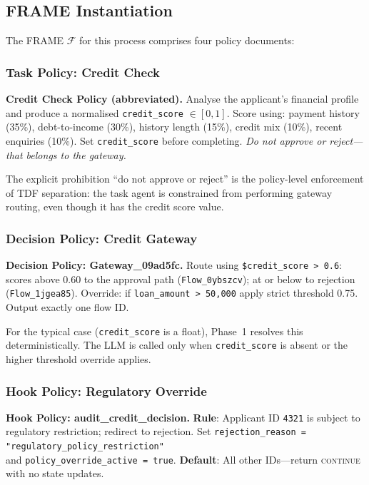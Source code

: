 \documentclass[11pt,a4paper]{article}
\begin{document}
\subsection{FRAME Instantiation}

The FRAME $\mathcal{F}$ for this process comprises four policy documents:

\subsubsection{Task Policy: Credit Check}

\begin{policybox}
\textbf{Credit Check Policy (abbreviated).}
Analyse the applicant's financial profile and produce a normalised
\texttt{credit\_score} $\in [0,1]$. Score using: payment history (35\%),
debt-to-income (30\%), history length (15\%), credit mix (10\%), recent
enquiries (10\%). Set \texttt{credit\_score} before completing. \emph{Do not
approve or reject---that belongs to the gateway.}
\end{policybox}

The explicit prohibition ``do not approve or reject'' is the policy-level
enforcement of TDF separation: the task agent is constrained from performing
gateway routing, even though it has the credit score value.

\subsubsection{Decision Policy: Credit Gateway}

\begin{policybox}
\textbf{Decision Policy: Gateway\_09ad5fc.}
Route using \texttt{\${credit\_score} > 0.6}: scores above 0.60 to the
approval path (\texttt{Flow\_0ybszcv}); at or below to rejection
(\texttt{Flow\_1jgea85}). Override: if \texttt{loan\_amount > 50{,}000} apply
strict threshold 0.75. Output exactly one flow ID.
\end{policybox}

For the typical case (\texttt{credit\_score} is a float), Phase~1 resolves this
deterministically. The LLM is called
only when \texttt{credit\_score} is absent or the higher threshold override
applies.

\subsubsection{Hook Policy: Regulatory Override}

\begin{policybox}
\textbf{Hook Policy: audit\_credit\_decision.}
\textbf{Rule}: Applicant ID \texttt{4321} is subject to regulatory restriction;
redirect to rejection. Set \texttt{rejection\_reason =}\\
\texttt{"regulatory\_policy\_restriction"}\\
and \texttt{policy\_override\_active = true}.
\textbf{Default}: All other IDs---return \textsc{continue} with no state
updates.
\end{policybox}
\end{document}
